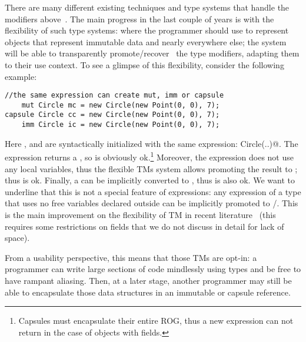 \noindent There are many different existing techniques and type systems that handle the modifiers above~\cite{ZibinEtAl10,ClarkeWrigstad03,HallerOdersky10,GordonEtAl12,ServettoZucca15}.
The main progress in the last couple of years is with the flexibility of such type systems:
 where the programmer should use \Q@imm@ to represent objects that represent immutable data
and \Q@mut@ nearly everywhere else; the system will be able to transparently promote/recover~\cite{GordonEtAl12,clebsch2015deny,ServettoZucca15} the type modifiers, adapting them to their use context.
To see a glimpse of this flexibility, consider the following example:
\saveSpace
\begin{lstlisting}
//the same expression can create mut, imm or capsule
    mut Circle mc = new Circle(new Point(0, 0), 7);
capsule Circle cc = new Circle(new Point(0, 0), 7);
    imm Circle ic = new Circle(new Point(0, 0), 7);
\end{lstlisting}
\saveSpace
Here \Q@mc@, \Q@ic@ and \Q@cc@ are syntactically initialized with the same expression: \Q@new Circle(..)@.
The \Q@new@ expression returns a \Q@mut@, so \Q@mc@ is obviously ok.\footnote{Capsules must encapsulate their entire ROG, thus a new expression
can not return \Q@capsule@ in the case of objects with \Q@mut@ fields.}
Moreover, the expression does not use any \Q@mut@ local variables, thus the flexible TMs system
allows promoting the \Q@mut@ result to \Q@capsule@; thus \Q@cc@ is ok.
Finally, a \Q@capsule@ can be implicitly converted to \Q@imm@, thus \Q@ic@ is also ok.
We want to underline that this is not a special feature of \Q@new@ expressions:
any expression of a \Q@mut@ type that uses no free \Q@mut@ variables declared outside can be implicitly promoted to \Q@capsule@/\Q@imm@. This is the main improvement on the flexibility of TM in recent literature~\cite{ServettoEtAl13a,ServettoZucca15,GordonEtAl12,clebsch2015deny,clebsch2017orca}
	(this requires some restrictions on \Q@read@ fields that we do not discuss in detail for lack of space).

From a usability perspective, this means that
those TMs are opt-in: a programmer can write large sections of code
mindlessly using \Q@mut@ types and be free to have rampant aliasing. 
Then, at a later stage, another programmer may still 
be able to encapsulate those data structures in an immutable or capsule reference.



